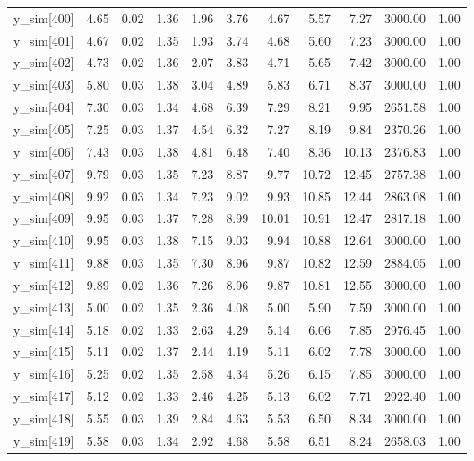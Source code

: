 \begin{table}[ht]
\begin{tabular}{rrrrrrrrrrr}
  y\_sim[400] & 4.65 & 0.02 & 1.36 & 1.96 & 3.76 & 4.67 & 5.57 & 7.27 & 3000.00 & 1.00 \\ 
  y\_sim[401] & 4.67 & 0.02 & 1.35 & 1.93 & 3.74 & 4.68 & 5.60 & 7.23 & 3000.00 & 1.00 \\ 
  y\_sim[402] & 4.73 & 0.02 & 1.36 & 2.07 & 3.83 & 4.71 & 5.65 & 7.42 & 3000.00 & 1.00 \\ 
  y\_sim[403] & 5.80 & 0.03 & 1.38 & 3.04 & 4.89 & 5.83 & 6.71 & 8.37 & 3000.00 & 1.00 \\ 
  y\_sim[404] & 7.30 & 0.03 & 1.34 & 4.68 & 6.39 & 7.29 & 8.21 & 9.95 & 2651.58 & 1.00 \\ 
  y\_sim[405] & 7.25 & 0.03 & 1.37 & 4.54 & 6.32 & 7.27 & 8.19 & 9.84 & 2370.26 & 1.00 \\ 
  y\_sim[406] & 7.43 & 0.03 & 1.38 & 4.81 & 6.48 & 7.40 & 8.36 & 10.13 & 2376.83 & 1.00 \\ 
  y\_sim[407] & 9.79 & 0.03 & 1.35 & 7.23 & 8.87 & 9.77 & 10.72 & 12.45 & 2757.38 & 1.00 \\ 
  y\_sim[408] & 9.92 & 0.03 & 1.34 & 7.23 & 9.02 & 9.93 & 10.85 & 12.44 & 2863.08 & 1.00 \\ 
  y\_sim[409] & 9.95 & 0.03 & 1.37 & 7.28 & 8.99 & 10.01 & 10.91 & 12.47 & 2817.18 & 1.00 \\ 
  y\_sim[410] & 9.95 & 0.03 & 1.38 & 7.15 & 9.03 & 9.94 & 10.88 & 12.64 & 3000.00 & 1.00 \\ 
  y\_sim[411] & 9.88 & 0.03 & 1.35 & 7.30 & 8.96 & 9.87 & 10.82 & 12.59 & 2884.05 & 1.00 \\ 
  y\_sim[412] & 9.89 & 0.02 & 1.36 & 7.26 & 8.96 & 9.87 & 10.81 & 12.55 & 3000.00 & 1.00 \\ 
  y\_sim[413] & 5.00 & 0.02 & 1.35 & 2.36 & 4.08 & 5.00 & 5.90 & 7.59 & 3000.00 & 1.00 \\ 
  y\_sim[414] & 5.18 & 0.02 & 1.33 & 2.63 & 4.29 & 5.14 & 6.06 & 7.85 & 2976.45 & 1.00 \\ 
  y\_sim[415] & 5.11 & 0.02 & 1.37 & 2.44 & 4.19 & 5.11 & 6.02 & 7.78 & 3000.00 & 1.00 \\ 
  y\_sim[416] & 5.25 & 0.02 & 1.35 & 2.58 & 4.34 & 5.26 & 6.15 & 7.85 & 3000.00 & 1.00 \\ 
  y\_sim[417] & 5.12 & 0.02 & 1.33 & 2.46 & 4.25 & 5.13 & 6.02 & 7.71 & 2922.40 & 1.00 \\ 
  y\_sim[418] & 5.55 & 0.03 & 1.39 & 2.84 & 4.63 & 5.53 & 6.50 & 8.34 & 3000.00 & 1.00 \\ 
  y\_sim[419] & 5.58 & 0.03 & 1.34 & 2.92 & 4.68 & 5.58 & 6.51 & 8.24 & 2658.03 & 1.00 \\ 

\end{tabular}
\end{table}
